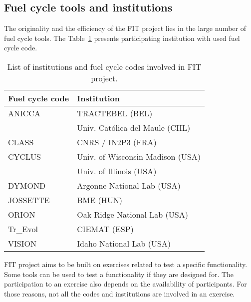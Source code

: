 \subsection{Fuel cycle tools and institutions}

The originality and the efficiency of the FIT project lies in the large number of fuel cycle tools. The Table~\ref{Tab:Code} presents participating institution with used fuel cycle code.

\begin{table}[h]
\centering
\begin{tabular}{ |l|l| }
  \hline
  Fuel cycle code & Institution \\
  \hline
  ANICCA\cite{} & TRACTEBEL (BEL) \\
   & Univ. Católica del Maule (CHL) \\
  \hline
  CLASS\cite{Thiolliere_2018} & CNRS / IN2P3 (FRA) \\
  \hline
  CYCLUS\cite{} & Univ. of Wisconsin Madison (USA) \\
  & Univ. of Illinois (USA) \\
  \hline
  DYMOND\cite{} & Argonne National Lab (USA) \\
  \hline
  JOSSETTE\cite{} & BME (HUN) \\
  \hline
  ORION\cite{} & Oak Ridge National Lab (USA) \\
  \hline
  Tr\_Evol\cite{} & CIEMAT (ESP) \\
  \hline
  VISION\cite{jacobson2009vision} & Idaho National Lab (USA) \\
  \hline
\end{tabular}
\label{Tab:Code}
\caption{List of institutions and fuel cycle codes involved in FIT project.}
\end{table}

FIT project aims to be built on exercises related to test a specific functionality. Some tools can be used to test a functionality if they are designed for. The participation to an exercise also depends on the availability of participants. For those reasons, not all the codes and institutions are involved in an exercise.
